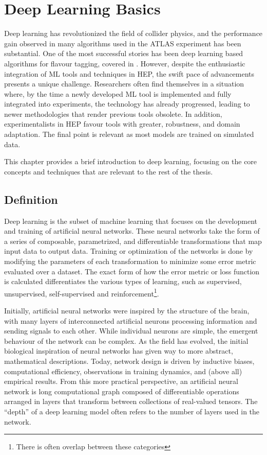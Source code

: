 \chapter{Deep Learning Basics}
\label{ch:deep_learning}

Deep learning has revolutionized the field of collider physics, and the performance gain observed in many algorithms used in the ATLAS experiment has been substantial.
One of the most successful stories has been deep learning based algorithms for flavour tagging, covered in .
However, despite the enthusiastic integration of ML tools and techniques in HEP, the swift pace of advancements presents a unique challenge.
Researchers often find themselves in a situation where, by the time a newly developed ML tool is implemented and fully integrated into experiments, the technology has already progressed, leading to newer methodologies that render previous tools obsolete.
In addition, experimentalists in HEP favour tools with greater, robustness, and domain adaptation.
The final point is relevant as most models are trained on simulated data.

This chapter provides a brief introduction to deep learning, focusing on the core concepts and techniques that are relevant to the rest of the thesis.

\section{Definition}

Deep learning is the subset of machine learning that focuses on the development and training of artificial neural networks.
These neural networks take the form of a series of composable, parametrized, and differentiable transformations that map input data to output data.
Training or optimization of the networks is done by modifying the parameters of each transformation to minimize some error metric evaluated over a dataset.
The exact form of how the error metric or loss function is calculated differentiates the various types of learning, such as supervised, unsupervised, self-supervised and reinforcement\footnote{There is often overlap between these categories}.

Initially, artificial neural networks were inspired by the structure of the brain, with many layers of interconnected artificial neurons processing information and sending signals to each other.
While individual neurons are simple, the emergent behaviour of the network can be complex.
As the field has evolved, the initial biological inspiration of neural networks has given way to more abstract, mathematical descriptions.
Today, network design is driven by inductive biases, computational efficiency, observations in training dynamics, and (above all) empirical results.
From this more practical perspective, an artificial neural network is long computational graph composed of differentiable operations arranged in layers that transform between collections of real-valued tensors.
The ``depth'' of a deep learning model often refers to the number of layers used in the network.

